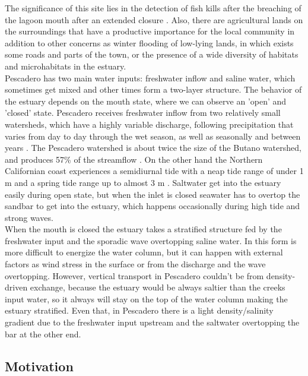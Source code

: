 \documentclass[tesis.tex]{subfiles}
\begin{document}
The significance of this site lies in the detection of fish kills after the breaching of the lagoon mouth after an extended closure \citep{largier2015}. Also, there are agricultural lands on the surroundings that have a productive importance for the local community in addition to other concerns as winter flooding of low-lying lands, in which exists some roads and parts of the town, or the presence of a wide diversity of habitats and microhabitats in the estuary.\\

Pescadero has two main water inputs: freshwater inflow and saline water, which sometimes get mixed and other times form a two-layer structure. The behavior of the estuary depends on the mouth state, where we can observe an 'open' and 'closed' state. Pescadero receives freshwater inflow from two relatively small watersheds, which have a highly variable discharge, following precipitation that varies from day to day through the wet season, as well as seasonally and between years \citep{largier2015}. The Pescadero watershed is about twice the size of the Butano watershed, and produces 57\% of the streamflow \citep{Williams2014}. On the other hand the Northern Californian coast experiences a semidiurnal tide with a neap tide range of under 1 m and a spring tide range up to almost 3 m \citep{Williams2014}. Saltwater get into the estuary easily during open state, but when the inlet is closed seawater has to overtop the sandbar to get into the estuary, which happens occasionally during high tide and strong waves.\\

When the mouth is closed the estuary takes a stratified structure fed by the freshwater input and the sporadic wave overtopping saline water. In this form is more difficult to energize the water column, but it can happen with external factors as wind stress in the surface or from the discharge and the wave overtopping. However, vertical transport in Pescadero couldn't be from density-driven exchange, because the estuary would be always saltier than the creeks input water, so it always will stay on the top of the water column making the estuary stratified. Even that, in Pescadero there is a light density/salinity gradient due to the freshwater input upstream and the saltwater overtopping the bar at the other end.\\

\subsection{Motivation}
\end{document}
